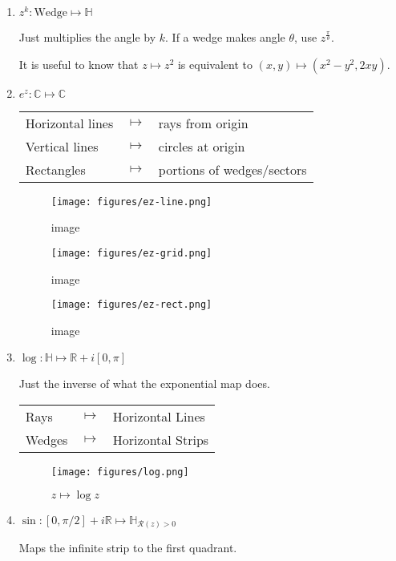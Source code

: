 \begin{enumerate}
\def\labelenumi{\arabic{enumi}.}
\setcounter{enumi}{2}
\item
  \(z^k: \text{Wedge} \mapsto \mathbb{H}\)

  Just multiplies the angle by \(k\). If a wedge makes angle \(\theta\),
  use \(z^\frac{\pi}{\theta}\).

  It is useful to know that \(z\mapsto z^2\) is equivalent to
  \((x,y) \mapsto (x^2-y^2, 2xy)\).
\item
  \(e^z: \mathbb{C} \mapsto \mathbb{C}\)

  \begin{longtable}[]{@{}lcl@{}}
  \toprule
  \endhead
  Horizontal lines & \(\mapsto\) & rays from origin\tabularnewline
  Vertical lines & \(\mapsto\) & circles at origin\tabularnewline
  Rectangles & \(\mapsto\) & portions of wedges/sectors\tabularnewline
  \bottomrule
  \end{longtable}

  \begin{figure}
  \centering
  \texttt{[image: figures/ez-line.png]}
  \caption{image}
  \end{figure}

  \begin{figure}
  \centering
  \texttt{[image: figures/ez-grid.png]}
  \caption{image}
  \end{figure}

  \begin{figure}
  \centering
  \texttt{[image: figures/ez-rect.png]}
  \caption{image}
  \end{figure}
\item
  \(\log: \mathbb{H} \mapsto \mathbb{R} + i[0, \pi]\)

  Just the inverse of what the exponential map does.

  \begin{longtable}[]{@{}lcl@{}}
  \toprule
  \endhead
  Rays & \(\mapsto\) & Horizontal Lines\tabularnewline
  Wedges & \(\mapsto\) & Horizontal Strips\tabularnewline
  \bottomrule
  \end{longtable}

  \begin{figure}
  \centering
  \texttt{[image: figures/log.png]}
  \caption{\(z \mapsto \log z\)}
  \end{figure}
\item
  \(\sin: [0, \pi/2] + i\mathbb{R} \mapsto \mathbb{H}_{\mathcal{R}(z)>0}\)

  Maps the infinite strip to the first quadrant.


\end{enumerate}
